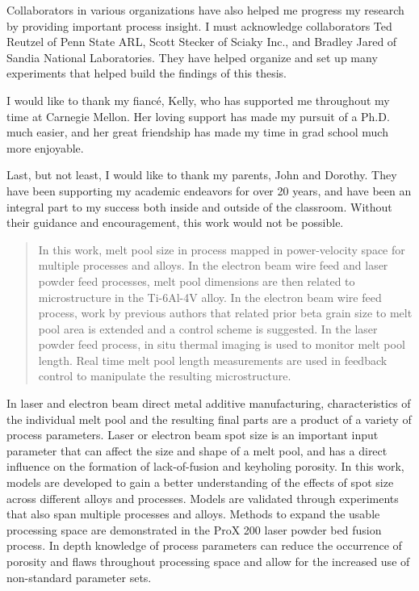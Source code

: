 \documentclass[10pt]{article}
\begin{document}
Collaborators in various organizations have also helped me progress my research by providing important process insight. I must acknowledge collaborators Ted Reutzel of Penn State ARL, Scott Stecker of Sciaky Inc., and Bradley Jared of Sandia National Laboratories. They have helped organize and set up many experiments that helped build the findings of this thesis.

I would like to thank my fiancé, Kelly, who has supported me throughout my time at Carnegie Mellon. Her loving support has made my pursuit of a Ph.D. much easier, and her great friendship has made my time in grad school much more enjoyable.

Last, but not least, I would like to thank my parents, John and Dorothy. They have been supporting my academic endeavors for over 20 years, and have been an integral part to my success both inside and outside of the classroom. Without their guidance and encouragement, this work would not be possible.

\begin{abstract}
In this work, melt pool size in process mapped in power-velocity space for multiple processes and alloys. In the electron beam wire feed and laser powder feed processes, melt pool dimensions are then related to microstructure in the Ti-6Al-4V alloy. In the electron beam wire feed process, work by previous authors that related prior beta grain size to melt pool area is extended and a control scheme is suggested. In the laser powder feed process, in situ thermal imaging is used to monitor melt pool length. Real time melt pool length measurements are used in feedback control to manipulate the resulting microstructure.
\end{abstract}

In laser and electron beam direct metal additive manufacturing, characteristics of the individual melt pool and the resulting final parts are a product of a variety of process parameters. Laser or electron beam spot size is an important input parameter that can affect the size and shape of a melt pool, and has a direct influence on the formation of lack-of-fusion and keyholing porosity. In this work, models are developed to gain a better understanding of the effects of spot size across different alloys and processes. Models are validated through experiments that also span multiple processes and alloys. Methods to expand the usable processing space are demonstrated in the ProX 200 laser powder bed fusion process. In depth knowledge of process parameters can reduce the occurrence of porosity and flaws throughout processing space and allow for the increased use of non-standard parameter sets.
\end{document}
